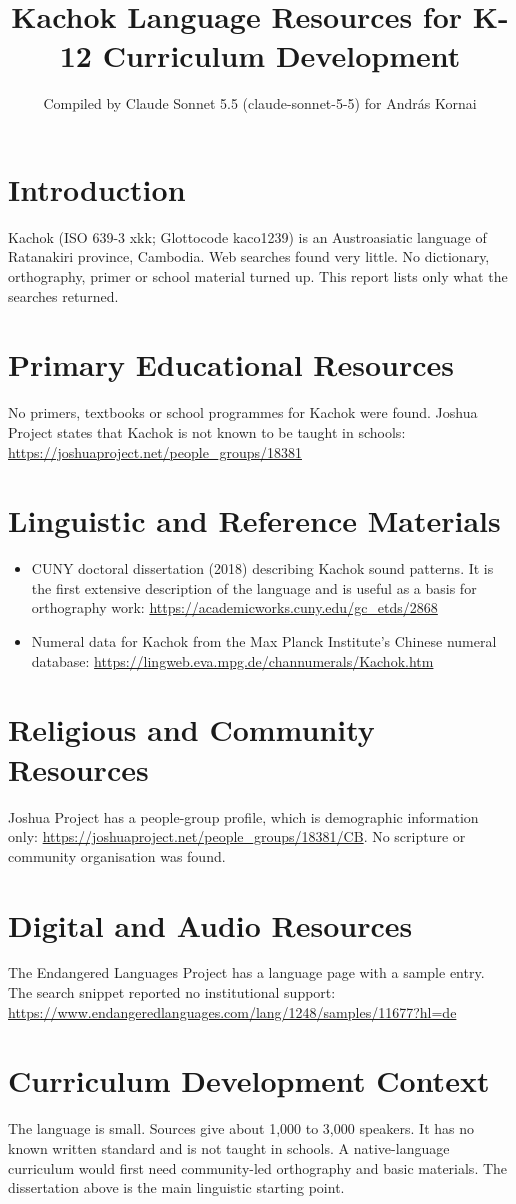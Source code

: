 \documentclass[12pt]{article}
\title{Kachok Language Resources for K-12 Curriculum Development}
\author{Compiled by Claude Sonnet 5.5 (claude-sonnet-5-5) for Andr\'as Kornai}
\date{}
\begin{document}
\maketitle

\section{Introduction}
Kachok (ISO 639-3 xkk; Glottocode kaco1239) is an Austroasiatic language of Ratanakiri province, Cambodia. Web searches found very little. No dictionary, orthography, primer or school material turned up. This report lists only what the searches returned.

\section{Primary Educational Resources}
No primers, textbooks or school programmes for Kachok were found. Joshua Project states that Kachok is not known to be taught in schools:
\url{https://joshuaproject.net/people_groups/18381}

\section{Linguistic and Reference Materials}
\begin{itemize}
\item CUNY doctoral dissertation (2018) describing Kachok sound patterns. It is the first extensive description of the language and is useful as a basis for orthography work: \url{https://academicworks.cuny.edu/gc_etds/2868}
\item Numeral data for Kachok from the Max Planck Institute's Chinese numeral database: \url{https://lingweb.eva.mpg.de/channumerals/Kachok.htm}
\end{itemize}

\section{Religious and Community Resources}
Joshua Project has a people-group profile, which is demographic information only: \url{https://joshuaproject.net/people_groups/18381/CB}. No scripture or community organisation was found.

\section{Digital and Audio Resources}
The Endangered Languages Project has a language page with a sample entry. The search snippet reported no institutional support: \url{https://www.endangeredlanguages.com/lang/1248/samples/11677?hl=de}

\section{Curriculum Development Context}
The language is small. Sources give about 1,000 to 3,000 speakers. It has no known written standard and is not taught in schools. A native-language curriculum would first need community-led orthography and basic materials. The dissertation above is the main linguistic starting point.
\end{document}
